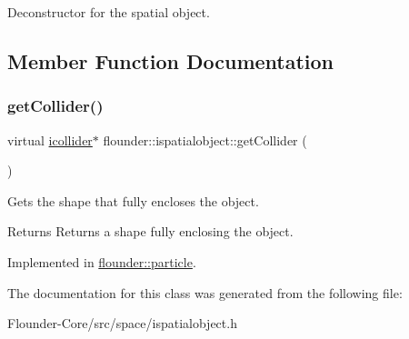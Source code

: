 Deconstructor for the spatial object. 



\subsection{Member Function Documentation}
\mbox{\label{classflounder_1_1ispatialobject_af3867cbb5f35b0296a16af77703e6c81}} 
\subsubsection{\texorpdfstring{get\+Collider()}{getCollider()}}
{\footnotesize\ttfamily virtual \hyperlink{classflounder_1_1icollider}{icollider}$\ast$ flounder\+::ispatialobject\+::get\+Collider (\begin{DoxyParamCaption}{ }\end{DoxyParamCaption})\hspace{0.3cm}{\ttfamily [pure virtual]}}



Gets the shape that fully encloses the object. 

\begin{DoxyReturn}{Returns}
Returns a shape fully enclosing the object. 
\end{DoxyReturn}


Implemented in \hyperlink{classflounder_1_1particle_a158ec50298e711488720eaf36600f828}{flounder\+::particle}.



The documentation for this class was generated from the following file\+:\begin{DoxyCompactItemize}
\item 
Flounder-\/\+Core/src/space/ispatialobject.\+h\end{DoxyCompactItemize}
